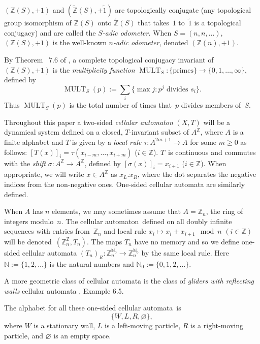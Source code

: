 \documentclass[12pt]{amsart}
\begin{document}
\noindent$({\mathbb Z}(S),+1)$ and 
$(\widetilde{\mathbb Z}(S),+\tilde1)$ are topologically conjugate 
(any topological group isomorphism of ${\mathbb Z}(S)$ onto
$\widetilde{\mathbb Z}(S)$ that takes~$1$
to~$\tilde1$ is a topological conjugacy)
 and are called the \emph {$S$-adic odometer}.
When $S = (n,n,\dots)$, 
$({\mathbb Z}(S),+1)$ is the well-known
\emph{$n$-adic odometer},
 denoted
$({\mathbb Z}(n), +1)$.

By Theorem ~7.6 of \cite{BS},  a complete topological conjugacy invariant of  
$({\mathbb Z}(S),+1)$ is the \emph{multiplicity function\/} 
$\operatorname{MULT}_S : \{\text{primes}\} \to 
\{0,1,\dots,\infty\}$, defined by
$$\operatorname{MULT}_S(p) := \sum_i \{\max j : p^j \text{ divides } s_i\}.$$
Thus $\operatorname{MULT}_S(p)$ is the total number of times that~$p$ divides members of~$S$.

  

 

Throughout this paper a two-sided  \emph{cellular automaton} $(X,T)$ will be  
a dynamical system defined on a closed, $T$-invariant subset of $A^{\mathbb Z}$,
where $A$ is a finite alphabet and
$T$ is given by a \emph{local rule}
$\tau : A^{2m+1} \to A$
for some $m \ge 0$ as follows: 
$[T(x)]_i = \tau(x_{i-m},\dots,x_{i+m})$  ($i \in {\mathbb Z}$).  $T$~is continuous and commutes with the 
\emph{shift}  
$\sigma: A^{\mathbb Z} \to A^{\mathbb Z}$,
defined by  $[\sigma(x)]_i = x_{i+1}$ ($i \in {\mathbb Z}$).
When appropriate, we will write
$x \in A^{\mathbb Z}$ as $x_L.x_R$,
where the dot separates the negative indices from the non-negative ones.
One-sided {cellular automata}\/ are similarly defined.  

When  $A$  has $n$ elements, we may sometimes assume that
$A = {\mathbb Z}_n$,  the ring of integers modulo~$n$.  The {cellular automaton}\ defined on all doubly infinite sequences with entries from~${\mathbb Z}_n$ and local rule
$x_i \mapsto x_i + x_{i+1} \mod n$
$(i \in {\mathbb Z})$
will be denoted~$({\mathbb Z}_n^{\mathbb Z},T_n)$. 
The maps $T_n$ have no memory and so we define one-sided 
cellular automata
$(T_n)_R : {\mathbb Z}_n^{{\mathbb N}_0} \to {\mathbb Z}_n^{{\mathbb N}_0}$
by the same local rule.  Here
${\mathbb N} := \{1,2,\dots\}$ is the natural numbers and  
${\mathbb N}_0 := \{0,1,2,\dots\}$.

A more geometric class of cellular automata is the class of 
\emph{gliders with reflecting walls\/} cellular automata \cite{M}, Example 6.5.

The alphabet for all these one-sided {cellular automata}\ is
$$ 
\{W,L,R,\varnothing\},
$$
where $W$ is a stationary wall, $L$ is a left-moving particle, $R$ is a right-moving particle, and $\varnothing$ is an empty space.
\end{document}
